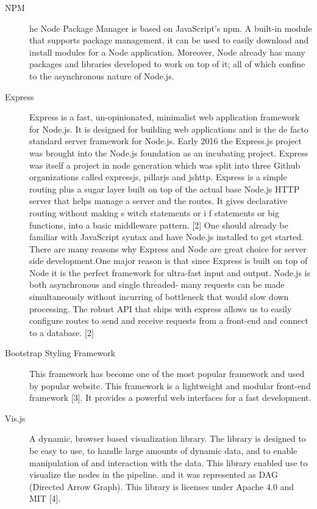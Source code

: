 \begin{description}
\begin{itemize}
    \end{itemize}
    \item[NPM] he Node Package Manager is based on JavaScript's npm. A built-in module that supports package management, it can be used to easily download and install modules for a Node application. Moreover, Node already has many packages and libraries developed to work on top of it; all of which confine to the asynchronous nature of Node.js.
    \item[Express] Express is a fast, un-opinionated, minimalist web application framework for Node.js. It is designed for building web applications and is the de facto standard server framework for Node.js. Early 2016 the Express.js project was brought into the Node.js foundation as an incubating project. Express was itself a project in node generation which was split into three Github organizations called expressjs, pillarjs and jshttp. Express is a simple routing plus a sugar layer built on top of the actual base Node.js HTTP server that helps manage a server and the routes. It gives declarative routing without making s witch statements or i f statements or big functions, into a basic middleware pattern. [2]
    \newline
    \newline
    One should already be familiar with JavaScript syntax and have Node.js installed to get started. There are many reasons why Express and Node are great choice for server side development.One major reason is that since Express is built on top of Node it is the perfect framework for ultra-fast input and output. Node.js is both asynchronous and single threaded- many requests can be made simultaneously without incurring of bottleneck that would slow down processing. The robust API that ships with express allows us to easily configure routes to send and receive
    requests from a front-end and connect to a database. [2]
    \item[Bootstrap Styling Framework] This  framework  has  become  one  of  the  most  popular  framework  and  used  by  popular website. This framework is  a  lightweight  and  modular  front-end  framework  [3].   It  provides  a powerful  web  interfaces for a fast development.
    \item[Vis.js] A dynamic, browser based visualization library. The library is designed to be easy to use, to handle large amounts of dynamic data, and to enable manipulation of and interaction with the data. This library enabled use to visualize the nodes in the pipeline. and it was represented as DAG (Directed Arrow Graph). This library is licenses under Apache 4.0 and MIT [4].
\end{description}

